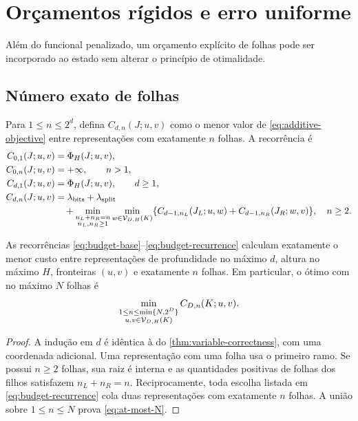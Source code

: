\section{Orçamentos rígidos e erro uniforme}
\label{sec:hard-budgets}

Além do funcional penalizado, um orçamento explícito de folhas pode ser
incorporado ao estado sem alterar o princípio de otimalidade.

\subsection{Número exato de folhas}

Para $1\le n\le2^d$, defina $C_{d,n}(J;u,v)$ como o menor valor de
\eqref{eq:additive-objective} entre representações com exatamente $n$ folhas.
A recorrência é
\begin{align}
 C_{0,1}(J;u,v)&=\Phi_H(J;u,v),\label{eq:budget-base}\\
 C_{0,n}(J;u,v)&=+\infty,\qquad n>1,\notag\\
 C_{d,1}(J;u,v)&=\Phi_H(J;u,v),\qquad d\ge1,\label{eq:budget-one}\\
 C_{d,n}(J;u,v)&=\lambda_{\rm bits}+\lambda_{\rm split}\notag\\
 &\quad+\min_{\substack{n_L+n_R=n\\n_L,n_R\ge1}}
 \min_{w\in\mathcal{V}_{D,H}(K)}
 \{C_{d-1,n_L}(J_L;u,w)+C_{d-1,n_R}(J_R;w,v)\},
 \quad n\ge2.
 \label{eq:budget-recurrence}
\end{align}

\begin{theorem}
\label{thm:leaf-budget}
As recorrências \eqref{eq:budget-base}--\eqref{eq:budget-recurrence}
calculam exatamente o menor custo entre representações de profundidade no
máximo $d$, altura no máximo $H$, fronteiras $(u,v)$ e exatamente $n$
folhas. Em particular, o ótimo com no máximo $N$ folhas é
\begin{equation}
 \min_{\substack{1\le n\le\min\{N,2^D\}\\
                  u,v\in\mathcal{V}_{D,H}(K)}}
 C_{D,n}(K;u,v).
 \label{eq:at-most-N}
\end{equation}
\end{theorem}

\begin{proof}
A indução em $d$ é idêntica à do
\cref{thm:variable-correctness}, com uma coordenada adicional. Uma
representação com uma folha usa o primeiro ramo. Se possui $n\ge2$ folhas,
sua raiz é interna e as quantidades positivas de folhas dos filhos satisfazem
$n_L+n_R=n$. Reciprocamente, toda escolha listada em
\eqref{eq:budget-recurrence} cola duas representações com exatamente $n$
folhas. A união sobre $1\le n\le N$ prova \eqref{eq:at-most-N}.
\end{proof}

